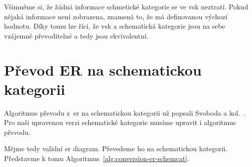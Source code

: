 Všimněme si, že žádná informace schmetické kategorie se ve \acrshort{vsk} neztratí.
Pokud nějaká informace není zobrazena, znamená to, že má definovanou výchozí hodnotu.
Díky tomu lze říci, že \acrshort{vsk} a schematická kategorie jsou na sebe vzájemně převoditelné a tedy jsou ekvivalentní.

\section{Převod ER na schematickou kategorii}

Algoritmus převodu z~\acrshort{er} na schematickou kategorii už popsali Svoboda a kol.~\cite[s.~192-196]{svoboda_categorical_2021}.
Pro naši upravenou verzi schematické kategorie musíme upravit i algoritmus převodu.

Mějme tedy validní \acrshort{er} diagram.
Převedeme ho na schematickou kategorii.
Představme k tomu Algoritmus~\ref{alg:conversion-er-schemcat}.

